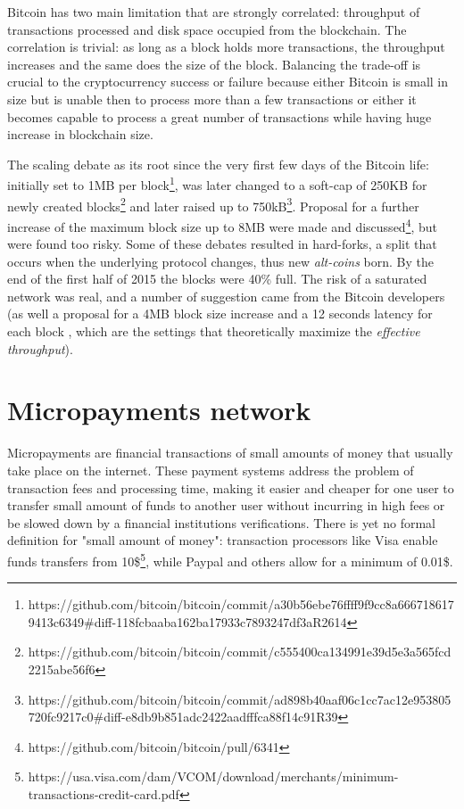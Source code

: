 		Bitcoin has two main limitation that are strongly correlated: throughput of transactions processed and disk space occupied from the blockchain. The correlation is trivial: as long as a block holds more transactions, the throughput increases and the same does the size of the block. Balancing the trade-off is crucial to the cryptocurrency success or failure because either Bitcoin is small in size but is unable then to process more than a few transactions or either it becomes capable to process a great number of transactions while having huge increase in blockchain size. 
		
		The scaling debate as its root since the very first few days of the Bitcoin life: initially set to 1MB per block\footnote{https://github.com/bitcoin/bitcoin/commit/a30b56ebe76ffff9f9cc8a6667186179413c6349\#diff-118fcbaaba162ba17933c7893247df3aR2614}, was later changed to a soft-cap of 250KB for newly created blocks\footnote{https://github.com/bitcoin/bitcoin/commit/c555400ca134991e39d5e3a565fcd2215abe56f6} and later raised up to 750kB\footnote{https://github.com/bitcoin/bitcoin/commit/ad898b40aaf06c1cc7ac12e953805720fc9217c0\#diff-e8db9b851adc2422aadfffca88f14c91R39}. Proposal for a further increase of the maximum block size up to 8MB were made and discussed\footnote{https://github.com/bitcoin/bitcoin/pull/6341}, but were found too risky. Some of these debates resulted in hard-forks, a split that occurs when the underlying protocol changes, thus new \textit{alt-coins} born.
		By the end of the first half of 2015 the blocks were 40\% full. The risk of a saturated network was real, and a number of suggestion came from the Bitcoin developers (as well a proposal for a 4MB block size increase and a 12 seconds latency for each block \cite{Croman}, which are the settings that theoretically maximize the \textit{effective throughput}). 
		
		\section{Micropayments network}
		
		Micropayments are financial transactions of small amounts of money that usually take place on the internet. These payment systems address the problem of transaction fees and processing time, making it easier and cheaper for one user to transfer small amount of funds to another user without incurring in high fees or be slowed down by a financial institutions verifications. There is yet no formal definition for "small amount of money": transaction processors like Visa enable funds transfers from 10\$\footnote{https://usa.visa.com/dam/VCOM/download/merchants/minimum-transactions-credit-card.pdf}, while Paypal and others allow for a minimum of 0.01\$. 
		
